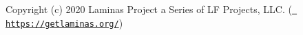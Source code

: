 Copyright (c) 2020 Laminas Project a Series of LF Projects, LLC. (\href{https://getlaminas.org/}{\texttt{ https\+://getlaminas.\+org/}}) 